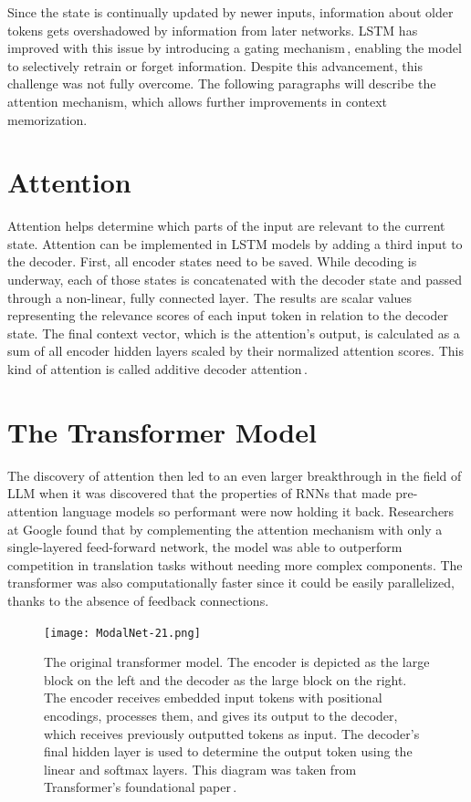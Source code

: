Since the state is continually updated by newer inputs, information about older tokens gets overshadowed by information from later networks. LSTM has improved with this issue by introducing a gating mechanism\,\cite{lstm1997}, enabling the model to selectively retrain or forget information. Despite this advancement, this challenge was not fully overcome. The following paragraphs will describe the attention mechanism, which allows further improvements in context memorization.

\section{Attention}

Attention helps determine which parts of the input are relevant to the current state. Attention can be implemented in LSTM models by adding a third input to the decoder. First, all encoder states need to be saved. While decoding is underway, each of those states is concatenated with the decoder state and passed through a non-linear, fully connected layer. The results are scalar values representing the relevance scores of each input token in relation to the decoder state. The final context vector, which is the attention's output, is calculated as a sum of all encoder hidden layers scaled by their normalized attention scores. This kind of attention is called additive decoder attention\,\cite{sennrich-etal-2016-neural}.

\medskip

\section{The Transformer Model}
The discovery of attention then led to an even larger breakthrough in the field of LLM when it was discovered that the properties of RNNs that made pre-attention language models so performant were now holding it back. Researchers at Google found that by complementing the attention mechanism with only a single-layered feed-forward network, the model was able to outperform competition in translation tasks without needing more complex components. The transformer was also computationally faster since it could be easily parallelized, thanks to the absence of feedback connections.

\begin{figure}[ht]
  \centering
  \texttt{[image: ModalNet-21.png]}
  \caption{The original transformer model. The encoder is depicted as the large block on the left and the decoder as the large block on the right. The encoder receives embedded input tokens with positional encodings, processes them, and gives its output to the decoder, which receives previously outputted tokens as input. The decoder's final hidden layer is used to determine the output token using the linear and softmax layers. This diagram was taken from Transformer's foundational paper\,\cite{Transformer2023}.}
  \label{fig:transformer}
\end{figure}


